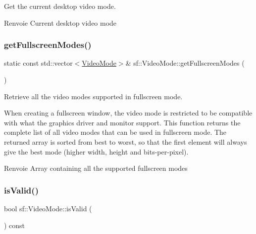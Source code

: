 Get the current desktop video mode. 

\begin{DoxyReturn}{Renvoie}
Current desktop video mode 
\end{DoxyReturn}
\mbox{\label{classsf_1_1VideoMode_a6815b9b3b35767d5b4563fbed4bfc67b}} 
\subsubsection{\texorpdfstring{get\+Fullscreen\+Modes()}{getFullscreenModes()}}
{\footnotesize\ttfamily static const std\+::vector$<$\hyperlink{classsf_1_1VideoMode}{Video\+Mode}$>$\& sf\+::\+Video\+Mode\+::get\+Fullscreen\+Modes (\begin{DoxyParamCaption}{ }\end{DoxyParamCaption})\hspace{0.3cm}{\ttfamily [static]}}



Retrieve all the video modes supported in fullscreen mode. 

When creating a fullscreen window, the video mode is restricted to be compatible with what the graphics driver and monitor support. This function returns the complete list of all video modes that can be used in fullscreen mode. The returned array is sorted from best to worst, so that the first element will always give the best mode (higher width, height and bits-\/per-\/pixel).

\begin{DoxyReturn}{Renvoie}
Array containing all the supported fullscreen modes 
\end{DoxyReturn}
\mbox{\label{classsf_1_1VideoMode_ad5e04c044b0925523c75ecb173d2129a}} 
\subsubsection{\texorpdfstring{is\+Valid()}{isValid()}}
{\footnotesize\ttfamily bool sf\+::\+Video\+Mode\+::is\+Valid (\begin{DoxyParamCaption}{ }\end{DoxyParamCaption}) const}



